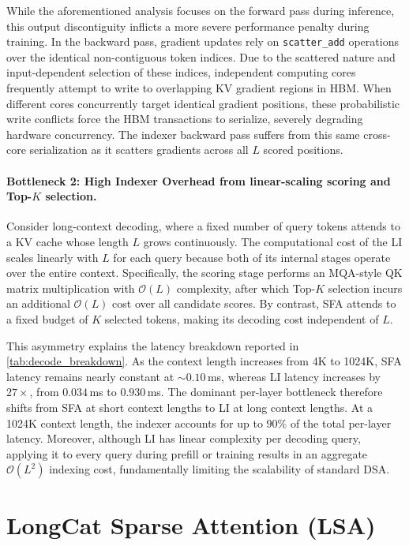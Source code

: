 \documentclass{article}
\begin{document}
While the aforementioned analysis focuses on the forward pass during inference, this output discontiguity inflicts a more severe performance penalty during training. In the backward pass, gradient updates rely on \texttt{scatter\_add} operations over the identical non-contiguous token indices. Due to the scattered nature and input-dependent selection of these indices, independent computing cores frequently attempt to write to overlapping KV gradient regions in HBM. When different cores concurrently target identical gradient positions, these probabilistic write conflicts force the HBM transactions to serialize, severely degrading hardware concurrency. The indexer backward pass suffers from this same cross-core serialization as it scatters gradients across all $L$ scored positions.

\paragraph{Bottleneck 2: High Indexer Overhead from linear-scaling scoring and Top-$K$ selection.}

Consider long-context decoding, where a fixed number of query tokens attends to a KV cache whose length $L$ grows continuously. The computational cost of the LI scales linearly with $L$ for each query because both of its internal stages operate over the entire context. Specifically, the scoring stage performs an MQA-style QK matrix multiplication with $\mathcal{O}(L)$ complexity, after which Top-$K$ selection incurs an additional $\mathcal{O}(L)$ cost over all candidate scores. By contrast, SFA attends to a fixed budget of $K$ selected tokens, making its decoding cost independent of $L$.

This asymmetry explains the latency breakdown reported in \cref{tab:decode_breakdown}. As the context length increases from 4K to 1024K, SFA latency remains nearly constant at ${\sim}0.10$\,ms, whereas LI latency increases by $27\times$, from $0.034$\,ms to $0.930$\,ms. The dominant per-layer bottleneck therefore shifts from SFA at short context lengths to LI at long context lengths. At a 1024K context length, the indexer accounts for up to $90\%$ of the total per-layer latency. Moreover, although LI has linear complexity per decoding query, applying it to every query during prefill or training results in an aggregate $\mathcal{O}(L^2)$ indexing cost, fundamentally limiting the scalability of standard DSA.

\section{LongCat Sparse Attention (LSA)}
\label{sec:lsa}
\end{document}
